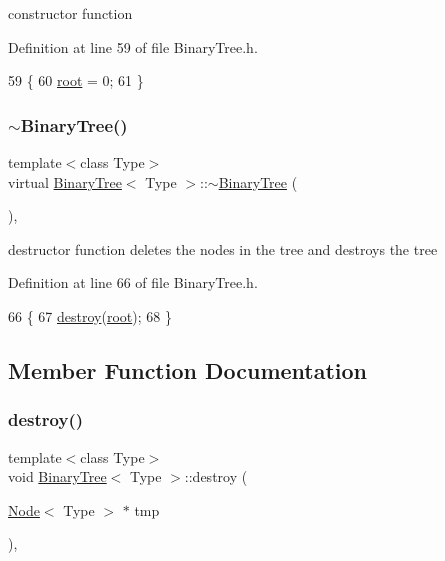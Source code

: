 constructor function 

Definition at line 59 of file Binary\+Tree.\+h.


\begin{DoxyCode}
59                 \{
60         \hyperlink{class_binary_tree_a8744322abfc99966f7d23d8560ed5702}{root} = 0;
61     \}
\end{DoxyCode}
\mbox{\label{class_binary_tree_a2bad873a7fc094d66a3076a86d11c428}} 
\subsubsection{\texorpdfstring{$\sim$\+Binary\+Tree()}{~BinaryTree()}}
{\footnotesize\ttfamily template$<$class Type$>$ \\
virtual \hyperlink{class_binary_tree}{Binary\+Tree}$<$ Type $>$\+::$\sim$\hyperlink{class_binary_tree}{Binary\+Tree} (\begin{DoxyParamCaption}{ }\end{DoxyParamCaption})\hspace{0.3cm}{\ttfamily [inline]}, {\ttfamily [virtual]}}

destructor function deletes the nodes in the tree and destroys the tree 

Definition at line 66 of file Binary\+Tree.\+h.


\begin{DoxyCode}
66                          \{
67         \hyperlink{class_binary_tree_a9b20827d019844170bb09465f885fef4}{destroy}(\hyperlink{class_binary_tree_a8744322abfc99966f7d23d8560ed5702}{root});
68     \}
\end{DoxyCode}


\subsection{Member Function Documentation}
\mbox{\label{class_binary_tree_a9b20827d019844170bb09465f885fef4}} 
\subsubsection{\texorpdfstring{destroy()}{destroy()}}
{\footnotesize\ttfamily template$<$class Type$>$ \\
void \hyperlink{class_binary_tree}{Binary\+Tree}$<$ Type $>$\+::destroy (\begin{DoxyParamCaption}\item[{\hyperlink{class_node}{Node}$<$ Type $>$ $\ast$}]{tmp }\end{DoxyParamCaption})\hspace{0.3cm}{\ttfamily [inline]}, {\ttfamily [private]}}

